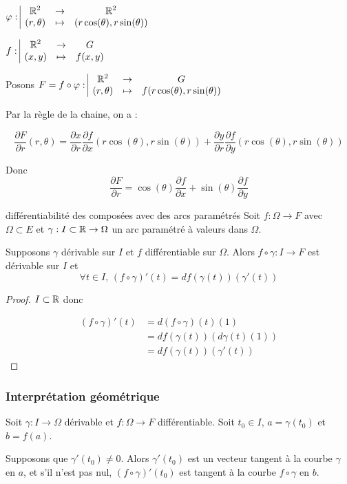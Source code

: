 \begin{exemple}
    $\varphi: \space \begin{array}{|ccc} \displaystyle \mathbb{R}^2 & \to & \displaystyle \mathbb{R}^2 \\ \displaystyle (r, \theta) & \mapsto & \displaystyle (r \cos(\theta), r \sin(\theta)) \end{array}$

    $f: \space \begin{array}{|ccc} \displaystyle \mathbb{R}^2 & \to & \displaystyle G \\ \displaystyle (x, y) & \mapsto & \displaystyle f(x, y) \end{array}$

    Posons $F = f \circ \varphi: \space \begin{array}{|ccc} \displaystyle \mathbb{R}^2 & \to & \displaystyle G \\ \displaystyle (r, \theta) & \mapsto & \displaystyle f(r \cos(\theta), r \sin(\theta)) \end{array}$

    Par la règle de la chaine, on a : 

    $$\frac{\partial F}{\partial r } (r, \theta) = \frac{\partial x}{\partial r } \frac{\partial f }{\partial x } (r \cos(\theta), r \sin(\theta)) + \frac{\partial y }{\partial r } \frac{\partial f }{\partial y } (r \cos(\theta), r \sin(\theta))$$

    Donc 
    $$\frac{\partial F}{\partial r } = \cos(\theta) \frac{\partial f }{\partial x }  + \sin(\theta) \frac{\partial f }{\partial y } $$
\end{exemple}

\begin{proposition}{différentiabilité des composées avec des arcs paramétrés}{}
    Soit $f : \Omega \to F$ avec $\Omega \subset E$ et 
    $\gamma : I  \subset \mathbb{R} \to \Omega$ un arc paramétré à valeurs dans $\Omega$.

    Supposons $\gamma$ dérivable sur $I$ et $f$ différentiable sur $\Omega$. Alors 
    $f \circ \gamma : I \to F$ est dérivable sur $I$ et 
    $$\forall t \in I, \, (f \circ \gamma)'(t) = df(\gamma(t))(\gamma'(t))$$
\end{proposition}

\begin{proof}
    $I \subset \mathbb{R}$ donc 

    \begin{align}
        (f \circ \gamma)'(t) & = d(f \circ \gamma)(t)(1) \\
        & = df(\gamma(t))(d\gamma(t)(1)) \\
        & = df(\gamma(t))(\gamma'(t))
    \end{align}
\end{proof}

\subsubsection{Interprétation géométrique}

Soit $\gamma : I \to \Omega$ dérivable et 
$f : \Omega \to F$ différentiable. Soit $t_0 \in I$, $a = \gamma(t_0)$ et 
$b = f(a)$.

Supposons que $\gamma'(t_0) \neq 0$. Alors $\gamma'(t_0)$ est un vecteur tangent à la 
courbe $\gamma$ en $a$, et s'il n'est pas nul, 
$(f \circ \gamma)'(t_0)$ est tangent à la courbe $f \circ \gamma$ en $b$.

